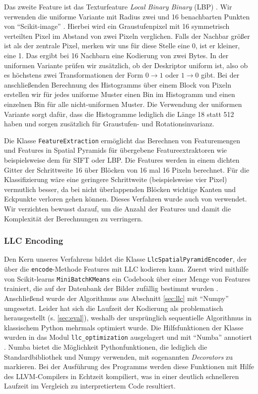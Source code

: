 Das zweite Feature ist das Texturfeature \emph{Local Binary Binary} (LBP) \cite{oph94}. Wir verwenden die uniforme Variante mit Radius zwei und 16 benachbarten Punkten von \enquote{Scikit-image} \cite{skimg}. Hierbei wird ein Graustufenpixel mit 16 symmetrisch verteilten Pixel im Abstand von zwei Pixeln verglichen. Falls der Nachbar größer ist als der zentrale Pixel, merken wir uns für diese Stelle eine 0, ist er kleiner, eine 1. Das ergibt bei 16 Nachbarn eine Kodierung von zwei Bytes. In der uniformen Variante prüfen wir zusätzlich, ob der Deskriptor uniform ist, also ob es höchstens zwei Transformationen der Form $0 \rightarrow 1$ oder $1 \rightarrow 0$ gibt. Bei der anschließenden Berechnung des Histogramms über einem Block von Pixeln erstellen wir für jedes uniforme Muster einen Bin im Histogramm und einen einzelnen Bin für alle nicht-uniformen Muster. Die Verwendung der uniformen Variante sorgt dafür, dass die Histogramme lediglich die Länge 18 statt 512 haben und sorgen zusätzlich für Graustufen- und Rotationsinvarianz. 

Die Klasse \texttt{FeatureExtraction} ermöglicht das Berechnen von Featuremengen und Features in Spatial Pyramids für übergebene Featureextraktoren wie beispielsweise dem für SIFT oder LBP. Die Features werden in einem dichten Gitter der Schrittweite 16 über Blöcken von 16 mal 16 Pixeln berechnet. Für die Klassifizierung wäre eine geringere Schrittweite (beispielsweise vier Pixel) vermutlich besser, da bei nicht überlappenden Blöcken wichtige Kanten und Eckpunkte verloren gehen können. Dieses Verfahren wurde auch von \cite{ywkjwh13} verwendet. Wir verzichten bewusst darauf, um die Anzahl der Features und damit die Komplexität der Berechnungen zu verringern.

\subsubsection{LLC Encoding}

Den Kern unseres Verfahrens bildet die Klasse \texttt{LlcSpatialPyramidEncoder}, der über die \texttt{encode}-Methode Features mit LLC kodieren kann. Zuerst wird mithilfe von Scikit-learns \texttt{MiniBatchKMeans} ein Codebook über einer Menge von Features trainiert, die auf der Datenbank der Bilder zufällig bestimmt wurden \cite{sklearn}. Anschließend wurde der Algorithmus aus Abschnitt \ref{sec:llc} mit \enquote{Numpy} umgesetzt. Leider hat sich die Laufzeit der Kodierung als problematisch herausgestellt (s. \ref{sec:eval}), weshalb der ursprünglich sequentielle Algorithmus in klassischem Python mehrmals optimiert wurde. Die Hilfsfunktionen der Klasse wurden in das Modul \texttt{llc\_optimization} ausgelagert und mit \enquote{Numba} annotiert \cite{numba}. Numba bietet die Möglichkeit Pythonfunktionen, die lediglich die Standardbibliothek und Numpy verwenden, mit sogenannten \emph{Decorators} zu markieren. Bei der Ausführung des Programms werden diese Funktionen mit Hilfe des LLVM-Compilers in Echtzeit kompiliert, was in einer deutlich schnelleren Laufzeit im Vergleich zu interpretiertem Code resultiert. 

